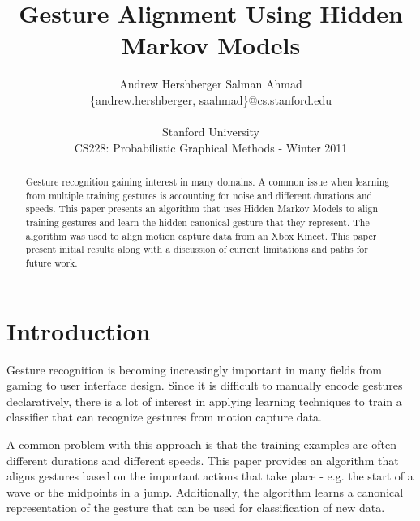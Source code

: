 \documentclass{article}
\title{Gesture Alignment Using Hidden Markov Models}
\author{
Andrew Hershberger
\quad Salman Ahmad \\
\{andrew.hershberger, saahmad\}@cs.stanford.edu
\\\\
Stanford University\\
CS228: Probabilistic Graphical Methods - Winter 2011\\
}
\begin{document}
\maketitle

\begin{abstract}

Gesture recognition gaining interest in many domains. A common issue when
learning from multiple training gestures is accounting for noise and different
durations and speeds. This paper presents an algorithm that uses Hidden Markov
Models to align training gestures and learn the hidden canonical gesture that
they represent. The algorithm was used to align motion capture data from an
Xbox Kinect. This paper present initial results along with a discussion of
current limitations and paths for future work.

\end{abstract}

\section{Introduction}

Gesture recognition is becoming increasingly important in many fields from
gaming to user interface design. Since it is difficult to manually encode
gestures declaratively, there is a lot of interest in applying learning
techniques to train a classifier that can recognize gestures from motion
capture data.

A common problem with this approach is that the training examples are often
different durations and different speeds. This paper provides an algorithm
that aligns gestures based on the important actions that take place - e.g. the
start of a wave or the midpoints in a jump. Additionally, the algorithm
learns a canonical representation of the gesture that can be used for
classification of new data.
\end{document}
